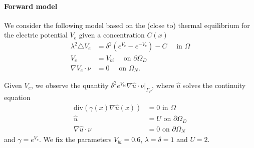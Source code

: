 \documentclass{amsart}
\theoremstyle{definition}
\renewcommand{\div}{\text{div}}
\begin{document}
\paragraph{Forward model}
We consider the following model based on the (close to) thermal equilibrium for  the electric potential $V_e$ given a concentration $C(x)$
\begin{equation}
    \begin{aligned}\label{eq: poisson equation}
    \lambda^2 \triangle V_e &= \delta^2 \left( e^{V_e} - e^{-V_e}\right) - C \quad  \text{ in } \Omega \\
    V_e &= V_{bi} \quad \text{ on } \partial \Omega_D \\
    \nabla V_e \cdot \nu & = 0 \quad \text{ on } \Omega_N.
    \end{aligned}
\end{equation}


Given $V_e$, we observe the quantity $\delta^2 e^{V_{bi}}\nabla \hat u \cdot \nu |_{\Gamma_P}$, where $\hat u$ solves the continuity equation
\begin{equation}\label{eq: continuity equation}
    \begin{aligned}
    \div\left( \gamma(x) \nabla \hat u(x) \right) & = 0 \text{ in } \Omega \\
    \hat u & = U \text{ on } \partial \Omega_D \\
    \nabla \hat u \cdot \nu & = 0 \text{ on } \partial \Omega_N
    \end{aligned}
\end{equation}
and $\gamma = e^{V_e}$. We fix the parameters $V_{bi} = 0.6$, $\lambda = \delta = 1$ and $U = 2$.
\end{document}
